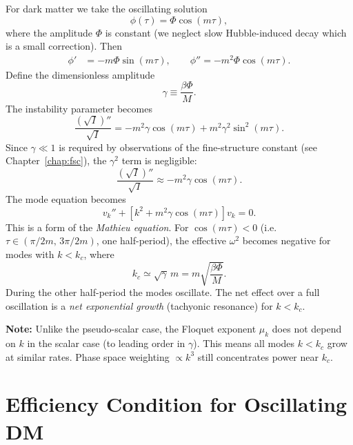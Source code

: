 \documentclass[12pt,a4paper,openany]{book}
\newcommand{\vk}{v_k}
\newcommand{\sqI}{\sqrt{I}}
\newcommand{\kc}{k_c}
\begin{document}
For dark matter we take the oscillating solution
\begin{equation}
  \phi(\tau) = \Phi\cos(m\tau),
  \label{eq:phiosc}
\end{equation}
where the amplitude $\Phi$ is constant (we neglect slow Hubble-induced decay which is a small correction). Then
\begin{align}
  \phi' &= -m\Phi\sin(m\tau), \qquad \phi'' = -m^2\Phi\cos(m\tau).
\end{align}
Define the dimensionless amplitude
\begin{equation}
  \boxed{\gamma \equiv \frac{\beta\Phi}{M}.}
  \label{eq:gamma}
\end{equation}
The instability parameter becomes
\begin{equation}
  \frac{(\sqI)''}{\sqI} = -m^2\gamma\cos(m\tau) + m^2\gamma^2\sin^2(m\tau).
\end{equation}
Since $\gamma \ll 1$ is required by observations of the fine-structure constant (see Chapter~\ref{chap:fsc}), the $\gamma^2$ term is negligible:
\begin{equation}
  \frac{(\sqI)''}{\sqI} \approx -m^2\gamma\cos(m\tau).
\end{equation}
The mode equation becomes
\begin{equation}
  \vk'' + \left[k^2 + m^2\gamma\cos(m\tau)\right]\vk = 0.
\end{equation}
This is a form of the \emph{Mathieu equation}. For $\cos(m\tau) < 0$ (i.e.\ $\tau \in (\pi/2m,\,3\pi/2m)$, one half-period), the effective $\omega^2$ becomes negative for modes with $k < \kc$, where
\begin{equation}
  \kc \simeq \sqrt{\gamma}\,m = m\sqrt{\frac{\beta\Phi}{M}}.
  \label{eq:kc_osc}
\end{equation}
During the other half-period the modes oscillate. The net effect over a full oscillation is a \emph{net exponential growth} (tachyonic resonance) for $k < \kc$.

\medskip
\noindent\textbf{Note:} Unlike the pseudo-scalar case, the Floquet exponent $\mu_k$ does not depend on $k$ in the scalar case (to leading order in $\gamma$). This means all modes $k < \kc$ grow at similar rates. Phase space weighting $\propto k^3$ still concentrates power near $\kc$.

\section{Efficiency Condition for Oscillating DM}
\end{document}
